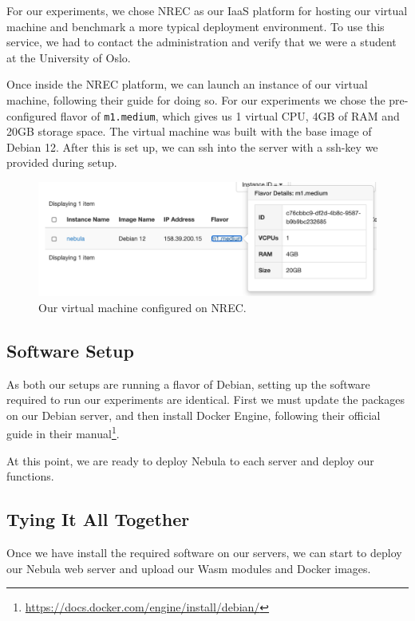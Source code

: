 \documentclass[
  table]{report}
\begin{document}
For our experiments, we chose \ac{NREC} as our \ac{IaaS} platform for
hosting our virtual machine and benchmark a more typical deployment
environment. To use this service, we had to contact the administration
and verify that we were a student at the University of Oslo.

Once inside the \ac{NREC} platform, we can launch an instance of our
virtual machine, following their guide for doing so. For our experiments
we chose the pre-configured flavor of \texttt{m1.medium}, which gives us
1 virtual CPU, 4GB of RAM and 20GB storage space. The virtual machine
was built with the base image of Debian 12. After this is set up, we can
ssh into the server with a ssh-key we provided during setup.

\begin{figure}[H]
\centering
  \includegraphics{assets/6-nrec_nebula}
  \caption{Our virtual machine configured on \ac{NREC}.}
  \label{fig:nrec_nebula}
\end{figure}

\subsection{Software Setup}

As both our setups are running a flavor of Debian, setting up the
software required to run our experiments are identical. First we must
update the packages on our Debian server, and then install Docker
Engine, following their official guide in their manual\footnote{\url{https://docs.docker.com/engine/install/debian/}}.

At this point, we are ready to deploy Nebula to each server and deploy
our functions.

\subsection{Tying It All Together}

Once we have install the required software on our servers, we can start
to deploy our Nebula web server and upload our \ac{Wasm} modules and
Docker images.
\end{document}
